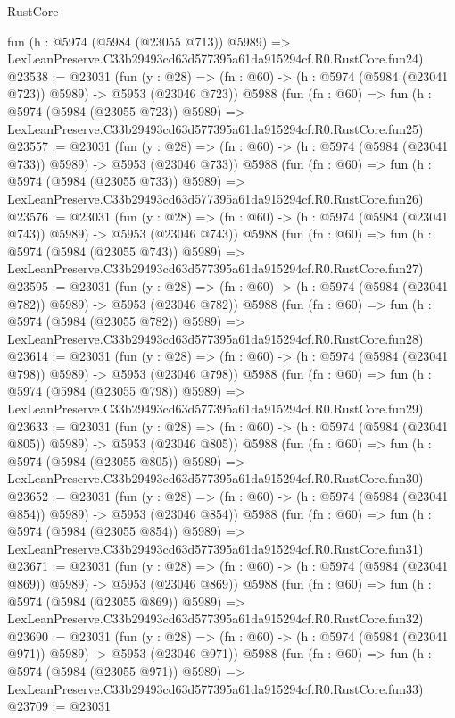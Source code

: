 \begin{lexlean}{RustCore}
\begin{coremodule}
    fun (h : @5974 (@5984 (@23055 @713)) @5989) =>
    LexLeanPreserve.C33b29493cd63d577395a61da915294cf.R0.RustCore.fun24)
@23538 := @23031
    (fun (y : @28) => (fn : @60) -> (h : @5974 (@5984 (@23041 @723)) @5989) -> @5953 (@23046 @723))
    @5988
    (fun (fn : @60) =>
    fun (h : @5974 (@5984 (@23055 @723)) @5989) =>
    LexLeanPreserve.C33b29493cd63d577395a61da915294cf.R0.RustCore.fun25)
@23557 := @23031
    (fun (y : @28) => (fn : @60) -> (h : @5974 (@5984 (@23041 @733)) @5989) -> @5953 (@23046 @733))
    @5988
    (fun (fn : @60) =>
    fun (h : @5974 (@5984 (@23055 @733)) @5989) =>
    LexLeanPreserve.C33b29493cd63d577395a61da915294cf.R0.RustCore.fun26)
@23576 := @23031
    (fun (y : @28) => (fn : @60) -> (h : @5974 (@5984 (@23041 @743)) @5989) -> @5953 (@23046 @743))
    @5988
    (fun (fn : @60) =>
    fun (h : @5974 (@5984 (@23055 @743)) @5989) =>
    LexLeanPreserve.C33b29493cd63d577395a61da915294cf.R0.RustCore.fun27)
@23595 := @23031
    (fun (y : @28) => (fn : @60) -> (h : @5974 (@5984 (@23041 @782)) @5989) -> @5953 (@23046 @782))
    @5988
    (fun (fn : @60) =>
    fun (h : @5974 (@5984 (@23055 @782)) @5989) =>
    LexLeanPreserve.C33b29493cd63d577395a61da915294cf.R0.RustCore.fun28)
@23614 := @23031
    (fun (y : @28) => (fn : @60) -> (h : @5974 (@5984 (@23041 @798)) @5989) -> @5953 (@23046 @798))
    @5988
    (fun (fn : @60) =>
    fun (h : @5974 (@5984 (@23055 @798)) @5989) =>
    LexLeanPreserve.C33b29493cd63d577395a61da915294cf.R0.RustCore.fun29)
@23633 := @23031
    (fun (y : @28) => (fn : @60) -> (h : @5974 (@5984 (@23041 @805)) @5989) -> @5953 (@23046 @805))
    @5988
    (fun (fn : @60) =>
    fun (h : @5974 (@5984 (@23055 @805)) @5989) =>
    LexLeanPreserve.C33b29493cd63d577395a61da915294cf.R0.RustCore.fun30)
@23652 := @23031
    (fun (y : @28) => (fn : @60) -> (h : @5974 (@5984 (@23041 @854)) @5989) -> @5953 (@23046 @854))
    @5988
    (fun (fn : @60) =>
    fun (h : @5974 (@5984 (@23055 @854)) @5989) =>
    LexLeanPreserve.C33b29493cd63d577395a61da915294cf.R0.RustCore.fun31)
@23671 := @23031
    (fun (y : @28) => (fn : @60) -> (h : @5974 (@5984 (@23041 @869)) @5989) -> @5953 (@23046 @869))
    @5988
    (fun (fn : @60) =>
    fun (h : @5974 (@5984 (@23055 @869)) @5989) =>
    LexLeanPreserve.C33b29493cd63d577395a61da915294cf.R0.RustCore.fun32)
@23690 := @23031
    (fun (y : @28) => (fn : @60) -> (h : @5974 (@5984 (@23041 @971)) @5989) -> @5953 (@23046 @971))
    @5988
    (fun (fn : @60) =>
    fun (h : @5974 (@5984 (@23055 @971)) @5989) =>
    LexLeanPreserve.C33b29493cd63d577395a61da915294cf.R0.RustCore.fun33)
@23709 := @23031

\end{coremodule}
\end{lexlean}
